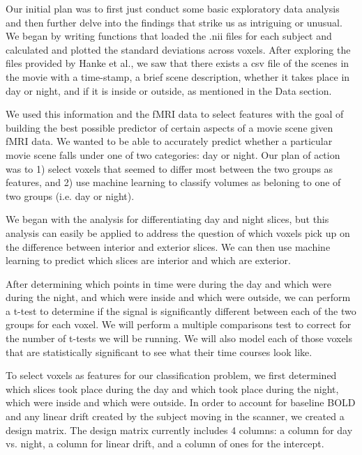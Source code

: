 \documentclass[11pt]{article}
\begin{document}
Our initial plan was to first just conduct some basic exploratory data
analysis and then further delve into the findings that strike us as intriguing
or unusual. We began by writing functions that loaded the .nii files for each
subject and calculated and plotted the standard deviations across voxels.
After exploring the files provided by Hanke et al., we saw that there exists a
csv file of the scenes in the movie with a time-stamp, a brief scene
description, whether it takes place in day or night, and if it is inside or
outside, as mentioned in the Data section.

We used this information and the fMRI data to select features with the goal of
building the best possible predictor of certain aspects of a movie scene given
fMRI data. We wanted to be able to accurately predict whether a particular
movie scene falls under one of two categories: day or night.  Our plan of 
action was to 1) select voxels that seemed to differ most between the two 
groups as features, and 2) use machine learning to classify volumes as 
beloning to one of two groups (i.e. day or night).

We began with the analysis for differentiating day and night slices, but this
analysis can easily be applied to address the question of which voxels pick up
on the difference between interior and exterior slices.  We can then use
machine learning to predict which slices are interior and which are exterior.

After determining which points in time were during the day and which were
during the night, and which were inside and which were outside, we can perform
a t-test to determine if the signal is significantly different between each of
the two groups for each voxel.  We will perform a multiple comparisons test to
correct for the number of t-tests we will be running.   We will also model
each of those voxels that are statistically significant to see what their time
courses look like.

To select voxels as features for our classification problem, we first
determined which slices took place during the day and which took place during
the night, which were inside and which were outside.  In order to account for
baseline BOLD and any linear drift created by the subject moving in the
scanner, we created a design matrix.  The design matrix currently includes 4
columns: a column for day vs. night, a column for linear drift, and a column 
of ones for the intercept.
\end{document}
